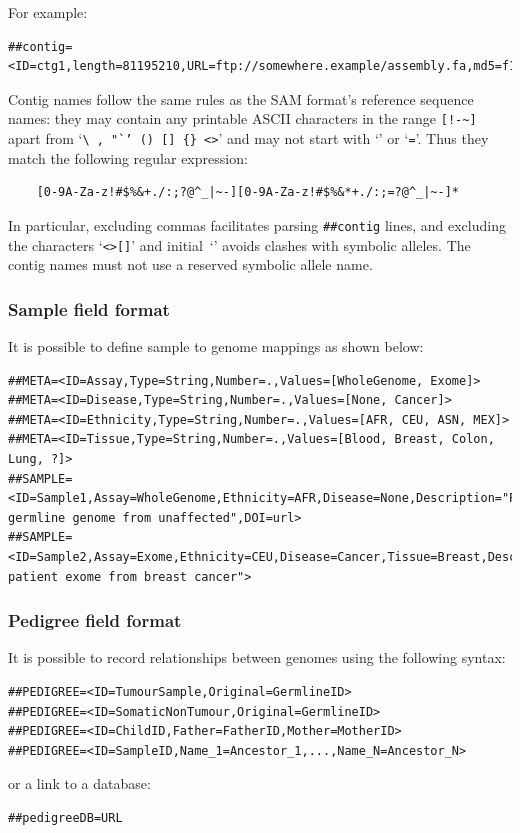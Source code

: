 \documentclass[8pt]{article}
\begin{document}
For example:
{\scriptsize
\begin{verbatim}
##contig=<ID=ctg1,length=81195210,URL=ftp://somewhere.example/assembly.fa,md5=f126cdf8a6e0c7f379d618ff66beb2da,...>
\end{verbatim}
}
\noindent
Contig names follow the same rules as the SAM format's reference sequence names:
they may contain any printable ASCII characters in the range \verb|[!-~]| apart from `{\tt\verb|\|\,,\,"`'\,()\,[]\,\verb|{}|\,<>}' and may not start with `{\tt *}' or `{\tt =}'.
Thus they match the following regular expression:
\begin{verbatim}
    [0-9A-Za-z!#$%&+./:;?@^_|~-][0-9A-Za-z!#$%&*+./:;=?@^_|~-]*
\end{verbatim}
\noindent
In particular, excluding commas facilitates parsing \verb|##contig| lines, and excluding the characters `\verb|<>[]|' and initial~`{\tt *}' avoids clashes with symbolic alleles.
The contig names must not use a reserved symbolic allele name.


\subsubsection{Sample field format}
It is possible to define sample to genome mappings as shown below:
{\scriptsize
\begin{verbatim}
##META=<ID=Assay,Type=String,Number=.,Values=[WholeGenome, Exome]>
##META=<ID=Disease,Type=String,Number=.,Values=[None, Cancer]>
##META=<ID=Ethnicity,Type=String,Number=.,Values=[AFR, CEU, ASN, MEX]>
##META=<ID=Tissue,Type=String,Number=.,Values=[Blood, Breast, Colon, Lung, ?]>
##SAMPLE=<ID=Sample1,Assay=WholeGenome,Ethnicity=AFR,Disease=None,Description="Patient germline genome from unaffected",DOI=url>
##SAMPLE=<ID=Sample2,Assay=Exome,Ethnicity=CEU,Disease=Cancer,Tissue=Breast,Description="European patient exome from breast cancer">
\end{verbatim}}

\subsubsection{Pedigree field format}
It is possible to record relationships between genomes using the following syntax:
\begin{verbatim}
##PEDIGREE=<ID=TumourSample,Original=GermlineID>
##PEDIGREE=<ID=SomaticNonTumour,Original=GermlineID>
##PEDIGREE=<ID=ChildID,Father=FatherID,Mother=MotherID>
##PEDIGREE=<ID=SampleID,Name_1=Ancestor_1,...,Name_N=Ancestor_N>
\end{verbatim}
\noindent or a link to a database:
\begin{verbatim}
##pedigreeDB=URL
\end{verbatim}
\end{document}
